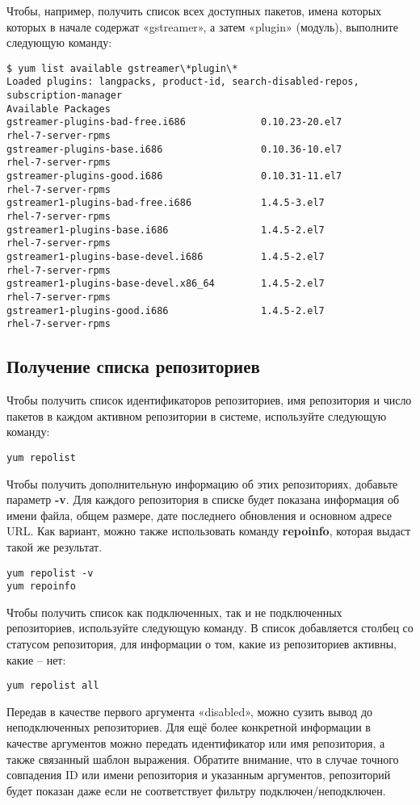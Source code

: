 \documentclass[a4paper,10pt,twoside]{article}
\begin{document}
Чтобы, например, получить список всех доступных пакетов, имена которых которых в начале содержат «gstreamer», а затем «plugin» (модуль), выполните следующую команду:
\begin{verbatim}
$ yum list available gstreamer\*plugin\*
Loaded plugins: langpacks, product-id, search-disabled-repos, subscription-manager
Available Packages
gstreamer-plugins-bad-free.i686             0.10.23-20.el7         rhel-7-server-rpms
gstreamer-plugins-base.i686                 0.10.36-10.el7         rhel-7-server-rpms
gstreamer-plugins-good.i686                 0.10.31-11.el7         rhel-7-server-rpms
gstreamer1-plugins-bad-free.i686            1.4.5-3.el7            rhel-7-server-rpms
gstreamer1-plugins-base.i686                1.4.5-2.el7            rhel-7-server-rpms
gstreamer1-plugins-base-devel.i686          1.4.5-2.el7            rhel-7-server-rpms
gstreamer1-plugins-base-devel.x86_64        1.4.5-2.el7            rhel-7-server-rpms
gstreamer1-plugins-good.i686                1.4.5-2.el7            rhel-7-server-rpms                                                                                     \end{verbatim} 

\subsection{Получение списка репозиториев}
Чтобы получить список идентификаторов репозиториев, имя репозитория и число пакетов в каждом активном репозитории в системе, используйте следующую команду:

\begin{verbatim}
yum repolist
\end{verbatim} 

Чтобы получить дополнительную информацию об этих репозиториях, добавьте параметр \textbf{-v}. Для каждого репозитория в списке будет показана информация об имени файла, общем размере, дате последнего обновления и основном адресе URL. Как вариант, можно также использовать команду \textbf{repoinfo}, которая выдаст такой же результат.
\begin{verbatim}
yum repolist -v
yum repoinfo
\end{verbatim} 
Чтобы получить список как подключенных, так и не подключенных репозиториев, используйте следующую команду. В список добавляется столбец со статусом репозитория, для информации о том, какие из репозиториев активны, какие -- нет:

\begin{verbatim}
yum repolist all
\end{verbatim} 
⁠Передав в качестве первого аргумента «disabled», можно сузить вывод до неподключенных репозиториев. Для ещё более конкретной информации в качестве аргументов можно передать идентификатор или имя репозитория, а также связанный шаблон выражения. Обратите внимание, что в случае точного совпадения ID или имени репозитория и указанным аргументов, репозиторий будет показан даже если не соответствует фильтру подключен/неподключен.
\end{document}
